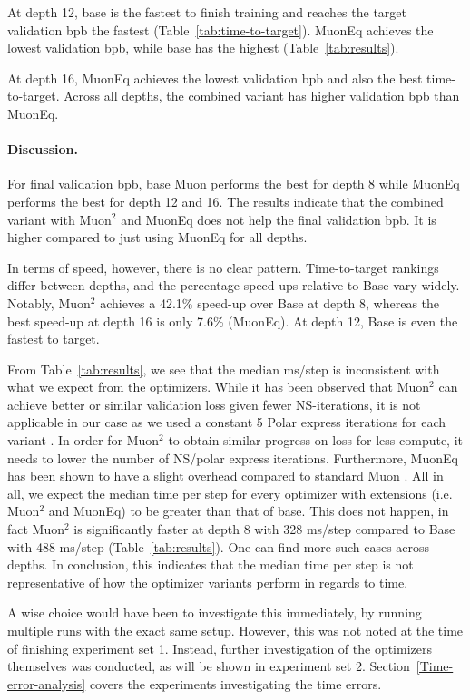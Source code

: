 \documentclass[11pt]{article}
\begin{document}
At depth 12, base is the fastest to finish training and reaches the target validation bpb the fastest (Table~\ref{tab:time-to-target}). MuonEq achieves the lowest validation bpb, while base has the highest (Table~\ref{tab:results}). 

At depth 16, MuonEq achieves the lowest validation bpb and also the best time-to-target. Across all depths, the combined variant has higher validation bpb than MuonEq. 

\paragraph{Discussion.}
For final validation bpb, base Muon performs the best for depth 8 while MuonEq performs the best for depth 12 and 16. The results indicate that the combined variant with Muon$^2$ and MuonEq does not help the final validation bpb. It is higher compared to just using MuonEq for all depths. 

In terms of speed, however, there is no clear pattern. Time-to-target rankings differ between depths, and the percentage speed-ups relative to Base vary widely. Notably, Muon$^2$ achieves a 42.1\% speed-up over Base at depth 8, whereas the best speed-up at depth 16 is only 7.6\% (MuonEq). At depth 12, Base is even the fastest to target. 

From Table~\ref{tab:results}, we see that the median ms/step is inconsistent with what we expect from the optimizers. While it has been observed that Muon$^2$ can achieve better or similar validation loss given fewer NS-iterations, it is not applicable in our case as we used a constant 5 Polar express iterations for each variant \cite{liu-etal-2026-muon2}. In order for Muon$^2$ to obtain similar progress on loss for less compute, it needs to lower the number of NS/polar express iterations. Furthermore, MuonEq has been shown to have a slight overhead compared to standard Muon \cite{chang2026muoneqbalancingorthogonalizationlightweight}. All in all, we expect the median time per step for every optimizer with extensions (i.e. Muon$^2$ and MuonEq) to be greater than that of base. This does not happen, in fact Muon$^2$ is significantly faster at depth 8 with 328 ms/step compared to Base with 488 ms/step (Table~\ref{tab:results}). One can find more such cases across depths. In conclusion, this indicates that the median time per step is not representative of how the optimizer variants perform in regards to time.

A wise choice would have been to investigate this immediately, by running multiple runs with the exact same setup. However, this was not noted at the time of finishing experiment set 1. Instead, further investigation of the optimizers themselves was conducted, as will be shown in experiment set 2. Section~\ref{Time-error-analysis} covers the experiments investigating the time errors. 
\end{document}
